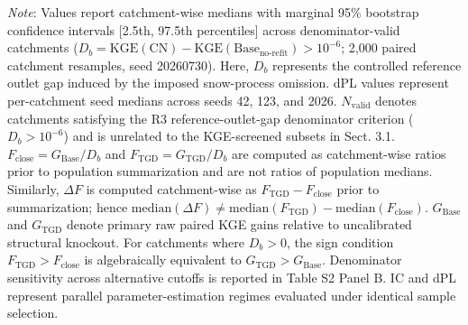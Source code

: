 \begin{table}[t]
\begin{threeparttable}
\begin{tablenotes}[flushleft]
\item \textit{Note}: Values report catchment-wise medians with marginal 95\% bootstrap confidence intervals [2.5th, 97.5th percentiles] across denominator-valid catchments ($D_b = \mathrm{KGE}(\mathrm{CN}) - \mathrm{KGE}(\mathrm{Base}_{\mathrm{no\text{-}refit}}) > 10^{-6}$; 2,000 paired catchment resamples, seed 20260730). Here, $D_b$ represents the controlled reference outlet gap induced by the imposed snow-process omission. dPL values represent per-catchment seed medians across seeds 42, 123, and 2026. $N_{\mathrm{valid}}$ denotes catchments satisfying the R3 reference-outlet-gap denominator criterion ($D_b > 10^{-6}$) and is unrelated to the KGE-screened subsets in Sect. 3.1. $F_{\mathrm{close}} = G_{\mathrm{Base}} / D_b$ and $F_{\mathrm{TGD}} = G_{\mathrm{TGD}} / D_b$ are computed as catchment-wise ratios prior to population summarization and are not ratios of population medians. Similarly, $\Delta F$ is computed catchment-wise as $F_{\mathrm{TGD}} - F_{\mathrm{close}}$ prior to summarization; hence $\mathrm{median}(\Delta F) \neq \mathrm{median}(F_{\mathrm{TGD}}) - \mathrm{median}(F_{\mathrm{close}})$. $G_{\mathrm{Base}}$ and $G_{\mathrm{TGD}}$ denote primary raw paired KGE gains relative to uncalibrated structural knockout. For catchments where $D_b > 0$, the sign condition $F_{\mathrm{TGD}} > F_{\mathrm{close}}$ is algebraically equivalent to $G_{\mathrm{TGD}} > G_{\mathrm{Base}}$. Denominator sensitivity across alternative cutoffs is reported in Table S2 Panel B. IC and dPL represent parallel parameter-estimation regimes evaluated under identical sample selection.
\end{tablenotes}
\end{threeparttable}
\end{table}
